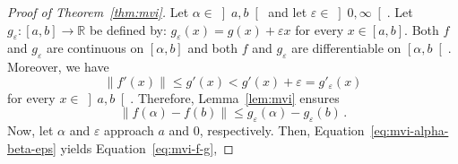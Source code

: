 \documentclass[12pt]{article}
\newcommand{\bR}{\mathbb{R}}
\newcommand{\norm}[1]{\left\| #1 \right\|}
\newcommand{\gtint}[1]{\left] #1, \infty \right[}
\begin{document}
\begin{proof}[Proof of Theorem~\ref{thm:mvi}]
  Let $\alpha \in \left]a, b \right[$ and let  $\varepsilon \in \gtint{0}$.
  Let $g_\varepsilon \colon [a, b] \to \bR$ be defined by: $g_\varepsilon(x) = g(x) + \varepsilon x$ for every $x \in [a, b]$.
  Both $f$ and $g_\varepsilon$ are continuous on $[\alpha, b]$ and 
  both $f$ and $g_\varepsilon$ are differentiable on $\left[\alpha, b \right[$.
  Moreover, we have 
  $$
  \norm{f'(x)} \le g'(x) < g'(x) + \varepsilon =  g'_\varepsilon(x)
  $$
  for every $x \in \left]a, b \right[$.
  Therefore, Lemma~\ref{lem:mvi} ensures 
  \begin{equation} \label{eq:mvi-alpha-beta-eps} 
  \norm{f(\alpha) - f(b)} \le g_\varepsilon(\alpha) - g_\varepsilon(b) \, .
\end{equation}
  Now, let $\alpha$ and $\varepsilon$ approach $a$ and $0$, respectively.
  Then, Equation~\eqref{eq:mvi-alpha-beta-eps} yields Equation~\eqref{eq:mvi-f-g},
\end{proof}


\end{document}
